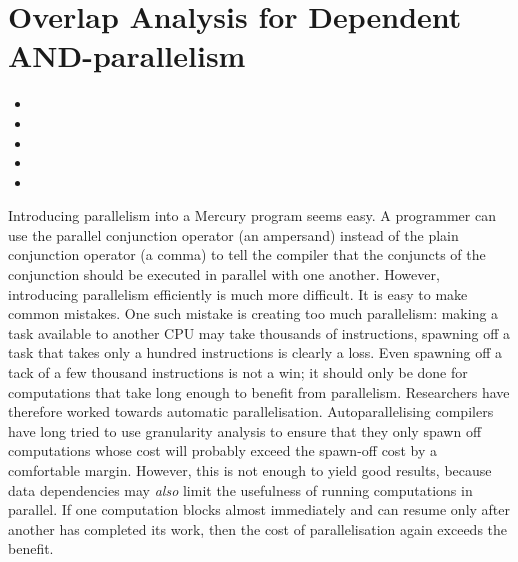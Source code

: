 
\chapter{Overlap Analysis for Dependent AND-parallelism}
\label{chap:overlap}


\begin{itemize}
\item {}

\item {}
\item {}
\item {}
\item {}
\end{itemize}

Introducing parallelism into a Mercury program seems easy.
A programmer can use the parallel conjunction operator (an ampersand)
instead of the plain conjunction operator (a comma) to tell the compiler
that the conjuncts of the conjunction should be executed in parallel with
one another.
However,
introducing parallelism efficiently is much more difficult.
It is easy to make common mistakes.
One such mistake is creating too much parallelism:
making a task available to another CPU
may take thousands of instructions,
spawning off a task that takes only a hundred instructions is clearly a loss.
Even spawning off a tack of a few thousand instructions is not a win;
it should only be done for computations
that take long enough to benefit from parallelism.
Researchers have therefore worked towards automatic parallelisation.
Autoparallelising compilers have long tried to use granularity analysis to
ensure that they only spawn off computations whose cost will probably exceed
the spawn-off cost by a comfortable margin.
However, this is not enough to yield good results,
because data dependencies may \emph{also} limit
the usefulness of running computations in parallel.
If one computation blocks almost immediately
and can resume only after another has completed its work,
then the cost of parallelisation again exceeds the benefit.

